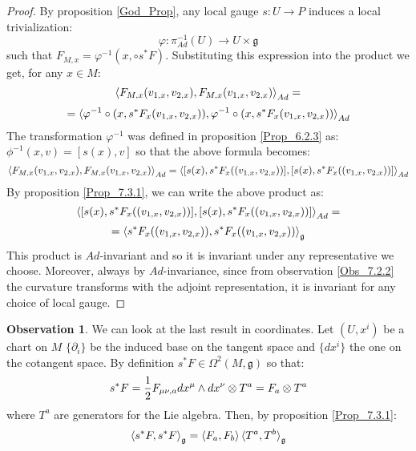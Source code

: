 \documentclass[12pt,a4paper]{report}
\theoremstyle{definition}
\theoremstyle{Theorem}
\theoremstyle{definition}
\theoremstyle{definition}
\newtheorem{Obs}[Def]{Observation}
\begin{document}
	\begin{proof}
		By proposition \ref{God_Prop}, any local gauge $s:U\rightarrow P$ induces a local trivialization:
		$$\varphi: \pi^{-1}_{Ad}(U)\rightarrow U\times \mathfrak{g}$$
		such that $F_{M,x}=\varphi^{-1}(x,\circ s^*F)$.
		Substituting this expression into the product we get, for any $x\in M$:
		$$\braket{F_{M,x}(v_{1,x},v_{2,x}),F_{M,x}(v_{1,x},v_{2,x})}_{Ad}=$$
		$$=\braket{\varphi^{-1}\circ (x,s^*F_x(v_{1,x},v_{2,x})),\varphi^{-1}\circ (x,s^*F_x(v_{1,x},v_{2,x}))}_{Ad}$$
		The transformation $\varphi^{-1}$ was defined in proposition \ref{Prop_6.2.3} as: $\phi^{-1}(x,v)=[s(x),v]$ so that the above formula becomes:
		$$\braket{F_{M,x}(v_{1,x},v_{2,x}),F_{M,x}(v_{1,x},v_{2,x})}_{Ad}=\braket{[s(x),s^*F_x((v_{1,x},v_{2,x}))],[s(x),s^*F_x((v_{1,x},v_{2,x}))]}_{Ad}$$
		By proposition \ref{Prop_7.3.1}, we can write the above product as:
		$$\braket{[s(x),s^*F_x((v_{1,x},v_{2,x}))],[s(x),s^*F_x((v_{1,x},v_{2,x}))]}_{Ad}=$$
		$$=\braket{s^*F_x((v_{1,x},v_{2,x})),s^*F_x((v_{1,x},v_{2,x}))}_\mathfrak{g}$$
		This product is $Ad$-invariant and so it is invariant under any representative we choose. Moreover, always by $Ad$-invariance, since from observation \ref{Obs_7.2.2} the curvature transforms with the adjoint representation, it is invariant for any choice of local gauge.
	\end{proof}
	\begin{Obs}\label{Obs_7.3.2}
		We can look at the last result in coordinates. Let $(U,x^i)$ be a chart on $M$ $\{\partial_i\}$ be the induced base on the tangent space and $\{dx^i\}$ the one on the cotangent space. By definition $s^*F\in \Omega^2(M,\mathfrak{g})$ so that:
		$$s^*F={1\over 2}F_{\mu\nu,a}dx^\mu\wedge dx^\nu\otimes T^a=F_a\otimes T^a$$
		where $T^a$ are generators for the Lie algebra. Then, by proposition \ref{Prop_7.3.1}:
		$$\braket{s^*F,s^*F}_\mathfrak{g}=\braket{F_a,F_b}\braket{T^a,T^b}_\mathfrak{g}$$
	\end{Obs}
\end{document}
